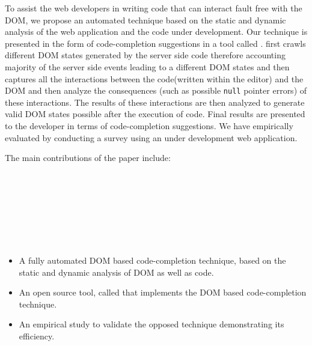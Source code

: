 To assist the web developers in writing \javascript code that can interact fault free with the DOM, we propose an automated technique based on the static and dynamic analysis of the web application and the \javascript code under development. Our technique is presented in the form of code-completion suggestions in a tool called \dompletion. \dompletion first crawls different DOM states generated by the server side code therefore accounting majority of the server side events leading to a different DOM states and then captures all the interactions between the \javascript code(written within the editor) and the DOM and then analyze the consequences (such as possible \texttt{null} pointer errors) of these interactions. The results of these interactions are then analyzed to generate valid DOM states possible after the execution of \javascript code. Final results are presented to the developer in terms of code-completion suggestions. We have empirically evaluated \dompletion by conducting a survey using an under development web application. 


The main contributions of the paper include: \\ \\ \\ \\ \\ \\ \\ \\
\begin{itemize}
	
	\item A fully automated DOM based code-completion technique, based on the static and dynamic analysis of DOM as well as \javascript code.
	\item An open source tool, called \dompletion that implements the DOM based code-completion technique.
	\item An empirical study to validate the opposed technique demonstrating its efficiency.
\end{itemize} 
